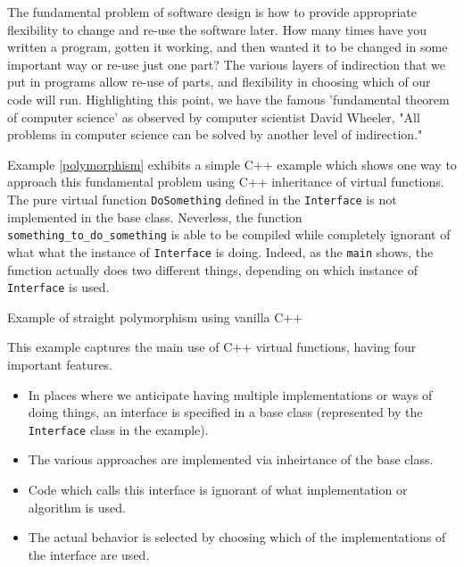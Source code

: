 \documentclass[12pt]{article}
\begin{document}
The fundamental problem of software design is how to provide appropriate 
flexibility to change and re-use the software later.  
How many times have you written a 
program, gotten it working, and then wanted it to be changed in some 
important way or re-use just one part?  The various layers of indirection
that we put in programs allow re-use of parts, and flexibility in choosing
which of our code will run.  Highlighting this point, we have the 
famous 'fundamental theorem of computer science' as observed by computer
scientist David Wheeler, "All problems in computer science can be solved by 
another level of indirection."  

Example \ref{polymorphism} exhibits a simple C++ example which shows one 
way to approach this fundamental problem using C++ inheritance of 
virtual functions.  The pure virtual function {\tt DoSomething}
defined in the {\tt Interface} is not implemented in the base class.  
Neverless, the function {\tt something\_to\_do\_something} is able
to be compiled while completely ignorant of what what the instance of
{\tt Interface} is doing.  Indeed, as the {\tt main} shows, the function
actually does two different things, depending on which instance of 
{\tt Interface} is used.

\begin{example}

\caption{Example of straight polymorphism using vanilla C++}
\label{polymorphism}
\end{example}


This example captures the main use of C++ virtual functions, having
four important features.  

\begin{itemize}

\item In places where
we anticipate having multiple implementations or ways of doing things, 
an interface is specified in a base class 
(represented by the {\tt Interface} class in 
the example).

\item The various approaches are implemented via inheirtance
of the base class.

\item Code which calls this interface is ignorant of what
implementation or algorithm is used.  

\item The actual behavior is selected by choosing which of the implementations
of the interface are used.  

\end{itemize}
\end{document}

